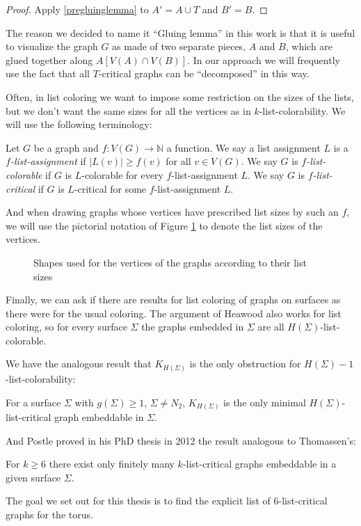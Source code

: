 \begin{proof} 
Apply \ref{pregluinglemma} to $A' = A \cup T$ and $B' = B$. 
\end{proof}


The reason we decided to name it ``Gluing lemma'' in this work is that it is useful to visualize the graph $G$ as made of two separate pieces, $A$ and $B$, which are glued together along $A[V(A) \cap V(B)]$. In our approach we will frequently use the fact that all $T$-critical graphs can be ``decomposed'' in this way. 

Often, in list coloring we want to impose some restriction on the sizes of the lists, but 
we don't want the same sizes for all the vertices as in $k$-list-colorability. We will
use the following terminology:

\begin{definition}
	Let $G$ be a graph and $f : V(G) \rightarrow \mathbb{N}$ a function. We say a list 
	assignment $L$ is a \emph{$f$-list-assignment} if $|L(v)| \geq f(v)$ for all $v \in V(G)$. 
	We say $G$ is \emph{$f$-list-colorable} if $G$ is $L$-colorable for every 
	$f$-list-assignment $L$.
	We say $G$ is \emph{$f$-list-critical} if $G$ is $L$-critical for some $f$-list-assignment
	$L$.
\end{definition}

And when drawing graphs whose vertices have prescribed list sizes by such an $f$, we
will use the pictorial notation of Figure \ref{fig:listsizenotation} to denote the list sizes
of the vertices.
\begin{figure}
\label{fig:listsizenotation}
\centering
{}
\caption{Shapes used for the vertices of the graphs according to their list sizes}
\end{figure}

Finally, we can ask if there are results for list coloring of graphs on surfaces as there were
for the usual coloring. The argument of Heawood also works for list coloring, so for every
surface $\Sigma$ the graphs embedded in $\Sigma$ are all $H(\Sigma)$-list-colorable.

We have the analogous result that $K_{H(\Sigma)}$ is the only obstruction for
$H(\Sigma)-1$-list-colorability:

\begin{theorem}
For a surface $\Sigma$ with $g(\Sigma) \geq 1$, $\Sigma \neq N_2$, $K_{H(\Sigma)}$ is the only
minimal $H(\Sigma)$-list-critical graph embeddable in $\Sigma$.
\end{theorem}

And Postle proved in his PhD thesis in 2012 the result analogous to Thomassen's:

\begin{theorem}
For $k \geq 6$ there exist only finitely many $k$-list-critical graphs embeddable in a given
surface $\Sigma$.
\end{theorem}

The goal we set out for this thesis is to find the explicit list of $6$-list-critical graphs 
for the torus. 



